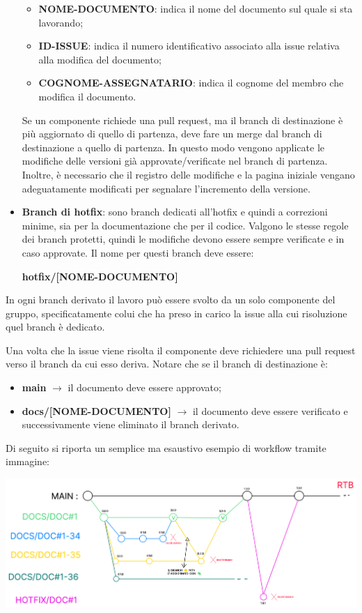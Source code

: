 \begin{itemize}
            \begin{itemize}
                  \item \textbf{NOME-DOCUMENTO}: indica il nome del documento sul quale si sta lavorando;
                  \item \textbf{ID-ISSUE}: indica il numero identificativo associato alla issue relativa alla modifica del documento;
                  \item \textbf{COGNOME-ASSEGNATARIO}: indica il cognome del membro che modifica il documento.
            \end{itemize}
            Se un componente richiede una pull request, ma il branch di destinazione è più aggiornato di quello di partenza,
            deve fare un merge dal branch di destinazione a quello di partenza. In questo modo vengono applicate le modifiche delle versioni
            già approvate/verificate nel branch di partenza. Inoltre, è necessario che il registro delle modifiche e la pagina iniziale
            vengano adeguatamente modificati per segnalare l'incremento della versione.
      \item \textbf{Branch di hotfix}: sono branch dedicati all'hotfix e quindi a correzioni minime, sia per la documentazione che per il codice. Valgono le stesse regole dei
            branch protetti, quindi le modifiche devono essere sempre verificate e in caso approvate.
            Il nome per questi branch deve essere:
            \begin{center}
                  \textbf{hotfix/[NOME-DOCUMENTO]}
            \end{center}
\end{itemize}

In ogni branch derivato il lavoro può essere svolto da un solo componente del
gruppo, specificatamente colui che ha preso in carico la issue alla cui
risoluzione quel branch è dedicato.

Una volta che la issue viene risolta il componente deve richiedere una pull
request verso il branch da cui esso deriva. Notare che se il branch di
destinazione è:
\begin{itemize}
      \item \textbf{main} $\rightarrow$ il documento deve essere approvato;
      \item \textbf{docs/[NOME-DOCUMENTO]} $\rightarrow$ il documento deve essere verificato e successivamente viene eliminato il branch derivato.
\end{itemize}

Di seguito si riporta un semplice ma esaustivo esempio di workflow tramite
immagine:
\begin{center}
      \includegraphics[scale = 0.33]{template/images/workflow.png}
\end{center}

